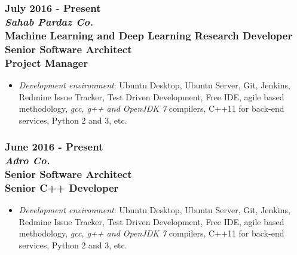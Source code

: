\documentclass[10pt,a4paper]{article}
\begin{document}
\subsubsection{{July 2016 - Present} \\ \textnormal {\textit {Sahab Pardaz Co.}} \\ {Machine Learning and Deep Learning Research Developer \\ Senior Software Architect \\ Project Manager}}
  \setlength{\leftskip}{0.5cm}
  \setlength{\rightskip}{1cm}
  \begin{itemize}
    \setlength{\rightskip}{1cm}
    \setlength\itemsep{0em}
    \item \small \textit {Development environment}: Ubuntu Desktop, Ubuntu Server, Git, Jenkins, Redmine Issue Tracker, Test Driven Development, Free IDE, agile based methodology, \textit {gcc, g++ and OpenJDK 7} compilers, C++11 for back-end services, Python 2 and 3, etc.
  \end{itemize}
  \setlength{\leftskip}{0pt}
  \setlength{\rightskip}{0cm}
  
\subsubsection{{June 2016 - Present} \\ \textnormal {\textit {Adro Co.}} \\ {Senior Software Architect \\ Senior C++ Developer}}
  \setlength{\leftskip}{0.5cm}
  \setlength{\rightskip}{1cm}
  \begin{itemize}
    \setlength{\rightskip}{1cm}
    \setlength\itemsep{0em}
    \item \small \textit {Development environment}: Ubuntu Desktop, Ubuntu Server, Git, Jenkins, Redmine Issue Tracker, Test Driven Development, Free IDE, agile based methodology, \textit {gcc, g++ and OpenJDK 7} compilers, C++11 for back-end services, Python 2 and 3, etc.
  \end{itemize}
  \setlength{\leftskip}{0pt}
  \setlength{\rightskip}{0cm}
  
\end{document}
